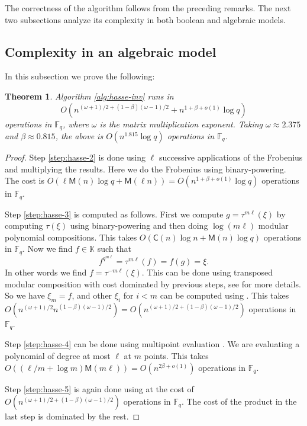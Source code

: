 \documentclass{article}
\theoremstyle{plain}
\newtheorem{theorem}{Theorem}
\theoremstyle{definition}
\def\F{\ensuremath{\mathbb{F}}}
\def\K{\ensuremath{\mathbb{K}}}
\def\MM{\ensuremath{\mathsf{M}}}
\def\CC{\ensuremath{\mathsf{C}}}
\begin{document}
 The correctness of the algorithm follows from the preceding remarks. The next two subsections 
 analyze its complexity in both boolean and algebraic models.
 

\subsection{Complexity in an algebraic model}

In this subsection we prove the following:
\begin{theorem}
	\label{theo:hasse-inv}
	Algorithm \ref{alg:hasse-inv} runs in
	\[O(n^{(\omega + 1) / 2 + (1 - \beta)(\omega - 1) / 2} + n^{1 + \beta + o(1)}\log q)\] 
	operations in $\F_q$, where $\omega$ is the matrix multiplication exponent. Taking $\omega 
	\approx	2.375$ and $\beta \approx 0.815$, the above is $O(n^{1.815}\log q)$ operations in 
	$\F_q$.
\end{theorem}

\begin{proof}
Step \ref{step:hasse-2} is done using $\ell$ successive applications of the Frobenius and 
multiplying the results. Here we do the Frobenius using binary-powering. The cost is 
$O(\ell\MM(n)\log q + \MM(\ell n)) = O(n^{1 + \beta + o(1)}\log q)$ operations in $\F_q$.

Step \ref{step:hasse-3} is computed as follows. First we compute $g = \tau^{m\ell}(\xi)$ by 
computing $\tau(\xi)$ using binary-powering and then doing $\log (m\ell)$ modular polynomial compositions. This takes $O(\CC(n)\log n + \MM(n)\log q)$ operations in $\F_q$. Now we find $f \in \K$ such that \[f^{q^{m\ell}} = \tau^{m\ell}(f) = f(g) = \xi.\]
In other words we find $f = \tau^{-m\ell}(\xi)$. This can be done using transposed modular 
composition with cost dominated by previous steps, see \cite{DeDoSc2014} for more details. So we 
have $\xi_m = f$, and other $\xi_i$ for $i < m$ can be computed using \cite[Lemma 3]{ks}. This 
takes $O(n^{(\omega + 1) / 2}n^{(1 - \beta)(\omega - 1) / 2}) = O(n^{(\omega + 1) / 2 + (1 - 
\beta)(\omega - 1) / 2})$ operations in $\F_q$.

Step \ref{step:hasse-4} can be done using multipoint evaluation \cite{vzGG}. We are evaluating a 
polynomial of degree at most $\ell$ at $m$ points. This takes $O((\ell / m + \log m) \MM(m\ell)) = 
O(n^{2\beta + o(1)})$ operations in $\F_q$.

 Step \ref{step:hasse-5} is again done using \cite[Lemma 3]{ks} at the cost of $O(n^{(\omega + 1) / 
 2 + (1 - \beta)(\omega - 1) / 2})$ operations in $\F_q$. The cost of the product in the last step 
 is dominated by the rest. %
\end{proof}
\end{document}
